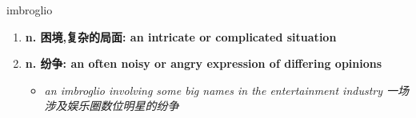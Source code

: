 
\begin{frame}
{\huge imbroglio}
\begin{center}
\begin{enumerate}\Large
  \item \textbf{n. 困境,复杂的局面: an intricate or complicated situation}
  \item \textbf{n. 纷争: an often noisy or angry expression of differing opinions}
  \begin{itemize}
    \item \em{\Large{an imbroglio involving some big names in the entertainment industry 一场涉及娱乐圈数位明星的纷争}}
  \end{itemize}
\end{enumerate}
\end{center}
\end{frame}
